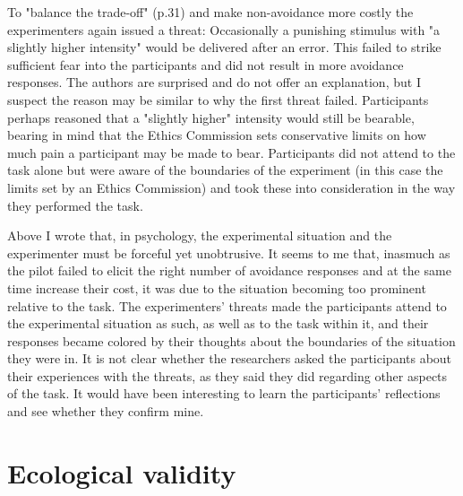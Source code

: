 \documentclass[twocolumn, serif, authordate, reflection]{jote-article}
\begin{document}
To "balance the trade-off" (p.31) and make non-avoidance more costly the experimenters again issued a threat: Occasionally a punishing stimulus with "a slightly higher intensity" \parencite[p.31]{Traxler2020} would be delivered after an error. This failed to strike sufficient fear into the participants and did not result in more avoidance responses. The authors are surprised and do not offer an explanation, but I suspect the reason may be similar to why the first threat failed. Participants perhaps reasoned that a "slightly higher" intensity would still be bearable, bearing in mind that the Ethics Commission sets conservative limits on how much pain a participant may be made to bear. Participants did not attend to the task alone but were aware of the boundaries of the experiment (in this case the limits set by an Ethics Commission) and took these into consideration in the way they performed the task.

Above I wrote that, in psychology, the experimental situation and the experimenter must be forceful yet unobtrusive. It seems to me that, inasmuch as the pilot failed to elicit the right number of avoidance responses and at the same time increase their cost, it was due to the situation becoming too prominent relative to the task. The experimenters' threats made the participants attend to the experimental situation as such, as well as to the task within it, and their responses became colored by their thoughts about the boundaries of the situation they were in. It is not clear whether the researchers asked the participants about their experiences with the threats, as they said they did regarding other aspects of the task. It would have been interesting to learn the participants' reflections and see whether they confirm mine.


 {}\section*{Ecological validity} 
\end{document}
